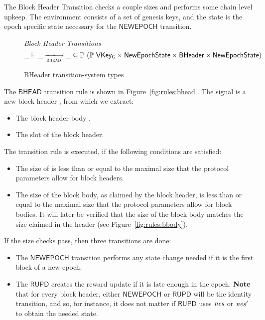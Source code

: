 The Block Header Transition checks a couple sizes and performs some chain level upkeep.
The environment consists of a set of genesis keys, and the state is the
epoch specific state necessary for the $\mathsf{NEWEPOCH}$ transition.

\begin{figure}
  \emph{Block Header Transitions}
  \begin{equation*}
    \_ \vdash \var{\_} \trans{bhead}{\_} \var{\_} \subseteq
    \powerset (\powerset{\VKeyGen} \times \NewEpochState \times \BHeader \times \NewEpochState)
  \end{equation*}
  \caption{BHeader transition-system types}
  \label{fig:ts-types:bheader}
\end{figure}

The $\mathsf{BHEAD}$ transition rule is shown in Figure~\ref{fig:rules:bhead}.
The signal is a new block header , from which we extract:

\begin{itemize}
\item The block header body .
\item The slot  of the block header.
\end{itemize}

The transition rule is executed, if the following conditions are satisfied:

\begin{itemize}
\item The size of  is less than or equal to the maximal size that the
  protocol parameters allow for block headers.
\item The size of the block body, as claimed by the block header, is less than or equal to the
  maximal size that the protocol parameters allow for block bodies.
  It will later be verified that the size of the block body matches the size claimed
  in the header (see Figure~\ref{fig:rules:bbody}).
\end{itemize}

If the size checks pass, then three transitions are done:

\begin{itemize}
  \item The $\mathsf{NEWEPOCH}$ transition performs any state change needed if it is the first
    block of a new epoch.
  \item The $\mathsf{RUPD}$ creates the reward update if it is late enough in the epoch.
    \textbf{Note} that for every block header, either $\mathsf{NEWEPOCH}$ or $\mathsf{RUPD}$
    will be the identity transition, and so, for instance, it does not matter if $\mathsf{RUPD}$
    uses $\mathit{nes}$ or $\mathit{nes}'$ to obtain the needed state.
\end{itemize}

